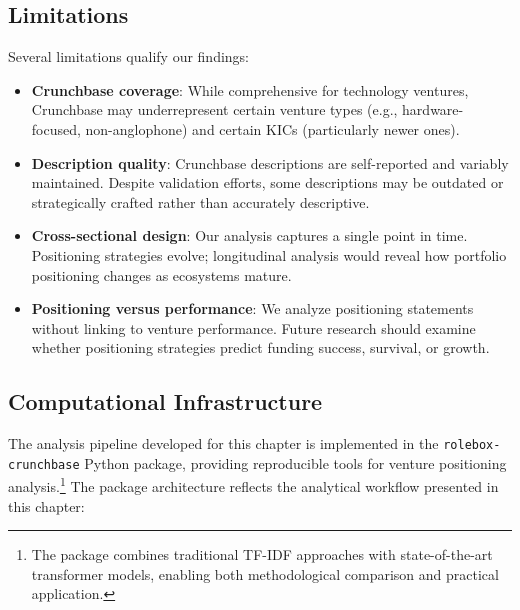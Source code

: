 \documentclass[../main.tex]{subfiles}
\begin{document}
\subsection{Limitations}

Several limitations qualify our findings:
\begin{itemize}
    \item \textbf{Crunchbase coverage}: While comprehensive for technology ventures, Crunchbase may underrepresent certain venture types (e.g., hardware-focused, non-anglophone) and certain KICs (particularly newer ones).

    \item \textbf{Description quality}: Crunchbase descriptions are self-reported and variably maintained. Despite validation efforts, some descriptions may be outdated or strategically crafted rather than accurately descriptive.

    \item \textbf{Cross-sectional design}: Our analysis captures a single point in time. Positioning strategies evolve; longitudinal analysis would reveal how portfolio positioning changes as ecosystems mature.

    \item \textbf{Positioning versus performance}: We analyze positioning statements without linking to venture performance. Future research should examine whether positioning strategies predict funding success, survival, or growth.
\end{itemize}

\subsection{Computational Infrastructure}

The analysis pipeline developed for this chapter is implemented in the \texttt{rolebox-crunchbase} Python package, providing reproducible tools for venture positioning analysis.\footnote{The package combines traditional TF-IDF approaches with state-of-the-art transformer models, enabling both methodological comparison and practical application.} The package architecture reflects the analytical workflow presented in this chapter:
\end{document}
